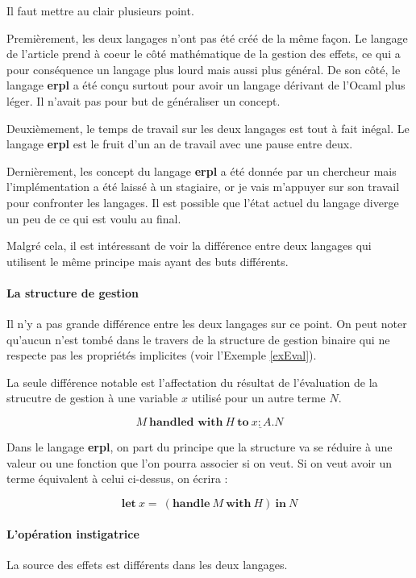 Il faut mettre au clair plusieurs point. 

Premièrement, les deux langages n'ont pas été créé de la même façon.
Le langage de l'article prend à coeur le côté mathématique de la gestion des effets, ce qui a pour conséquence
un langage plus lourd mais aussi plus général. De son côté, le langage \textbf{erpl} a été conçu surtout pour 
avoir un langage dérivant de l'Ocaml plus léger. Il n'avait pas pour but de généraliser un concept.

Deuxièmement, le temps de travail sur les deux langages est tout à fait inégal. Le langage \textbf{erpl} est le fruit d'un 
an de travail avec une pause entre deux.

Dernièrement, les concept du langage \textbf{erpl} a été donnée par un chercheur mais l'implémentation a été laissé
à un stagiaire, or je vais m'appuyer sur son travail pour confronter les langages. Il est possible que l'état actuel
du langage diverge un peu de ce qui est voulu au final.

Malgré cela, il est intéressant de voir la différence entre deux langages qui utilisent le même principe mais ayant des buts 
différents.

\paragraph{La structure de gestion} Il n'y a pas grande différence entre les deux langages sur ce point.
On peut noter qu'aucun n'est tombé dans le travers de la structure de gestion binaire qui ne respecte pas
les propriétés implicites (voir l'Exemple \ref{exEval}). 

La seule différence notable est l'affectation du résultat de l'évaluation de la strucutre de  gestion
à une variable $x$ utilisé pour un autre terme $N$.

\[M~\textbf{handled~with}~H~\underline{\textbf{to}~x:A.N}\]

Dans le langage \textbf{erpl}, on part du principe que la structure va se réduire à une valeur ou une fonction que l'on
pourra associer si on veut. Si on veut avoir un terme équivalent à celui ci-dessus, on écrira :

\[ \textbf{let}~x =~(\textbf{handle}~M~\textbf{with}~H)~\textbf{in}~N \]

\paragraph{L'opération instigatrice} La source des effets est différents dans les deux langages.


